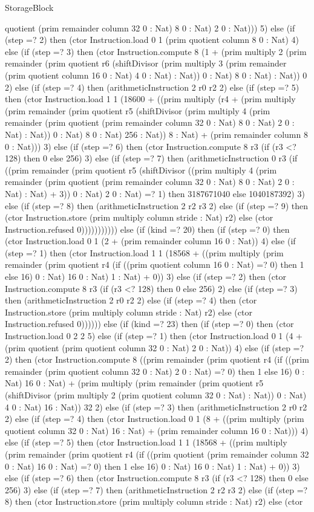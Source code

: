 \begin{lexlean}{StorageBlock}
\begin{semanticmodule}
{quotient (prim remainder column 32 0 : Nat) 8 0 : Nat) 2 0 : Nat))) 5) else (if (step =? 2) then (ctor Instruction.load 0 1 (prim quotient column 8 0 : Nat) 4) else (if (step =? 3) then (ctor Instruction.compute 8 (1 + (prim multiply 2 (prim remainder (prim quotient r6 (shiftDivisor (prim multiply 3 (prim remainder (prim quotient column 16 0 : Nat) 4 0 : Nat) : Nat)) 0 : Nat) 8 0 : Nat) : Nat)) 0 2) else (if (step =? 4) then (arithmeticInstruction 2 r0 r2 2) else (if (step =? 5) then (ctor Instruction.load 1 1 (18600 + ((prim multiply (r4 + (prim multiply (prim remainder (prim quotient r5 (shiftDivisor (prim multiply 4 (prim remainder (prim quotient (prim remainder column 32 0 : Nat) 8 0 : Nat) 2 0 : Nat) : Nat)) 0 : Nat) 8 0 : Nat) 256 : Nat)) 8 : Nat) + (prim remainder column 8 0 : Nat))) 3) else (if (step =? 6) then (ctor Instruction.compute 8 r3 (if (r3 <? 128) then 0 else 256) 3) else (if (step =? 7) then (arithmeticInstruction 0 r3 (if ((prim remainder (prim quotient r5 (shiftDivisor ((prim multiply 4 (prim remainder (prim quotient (prim remainder column 32 0 : Nat) 8 0 : Nat) 2 0 : Nat) : Nat) + 3)) 0 : Nat) 2 0 : Nat) =? 1) then 3187671040 else 1040187392) 3) else (if (step =? 8) then (arithmeticInstruction 2 r2 r3 2) else (if (step =? 9) then (ctor Instruction.store (prim multiply column stride : Nat) r2) else (ctor Instruction.refused 0))))))))))) else (if (kind =? 20) then (if (step =? 0) then (ctor Instruction.load 0 1 (2 + (prim remainder column 16 0 : Nat)) 4) else (if (step =? 1) then (ctor Instruction.load 1 1 (18568 + ((prim multiply (prim remainder (prim quotient r4 (if ((prim quotient column 16 0 : Nat) =? 0) then 1 else 16) 0 : Nat) 16 0 : Nat) 1 : Nat) + 0)) 3) else (if (step =? 2) then (ctor Instruction.compute 8 r3 (if (r3 <? 128) then 0 else 256) 2) else (if (step =? 3) then (arithmeticInstruction 2 r0 r2 2) else (if (step =? 4) then (ctor Instruction.store (prim multiply column stride : Nat) r2) else (ctor Instruction.refused 0)))))) else (if (kind =? 23) then (if (step =? 0) then (ctor Instruction.load 0 2 2 5) else (if (step =? 1) then (ctor Instruction.load 0 1 (4 + (prim quotient (prim quotient column 32 0 : Nat) 2 0 : Nat)) 4) else (if (step =? 2) then (ctor Instruction.compute 8 ((prim remainder (prim quotient r4 (if ((prim remainder (prim quotient column 32 0 : Nat) 2 0 : Nat) =? 0) then 1 else 16) 0 : Nat) 16 0 : Nat) + (prim multiply (prim remainder (prim quotient r5 (shiftDivisor (prim multiply 2 (prim quotient column 32 0 : Nat) : Nat)) 0 : Nat) 4 0 : Nat) 16 : Nat)) 32 2) else (if (step =? 3) then (arithmeticInstruction 2 r0 r2 2) else (if (step =? 4) then (ctor Instruction.load 0 1 (8 + ((prim multiply (prim quotient column 32 0 : Nat) 16 : Nat) + (prim remainder column 16 0 : Nat))) 4) else (if (step =? 5) then (ctor Instruction.load 1 1 (18568 + ((prim multiply (prim remainder (prim quotient r4 (if ((prim quotient (prim remainder column 32 0 : Nat) 16 0 : Nat) =? 0) then 1 else 16) 0 : Nat) 16 0 : Nat) 1 : Nat) + 0)) 3) else (if (step =? 6) then (ctor Instruction.compute 8 r3 (if (r3 <? 128) then 0 else 256) 3) else (if (step =? 7) then (arithmeticInstruction 2 r2 r3 2) else (if (step =? 8) then (ctor Instruction.store (prim multiply column stride : Nat) r2) else (ctor }
\end{semanticmodule}
\end{lexlean}
